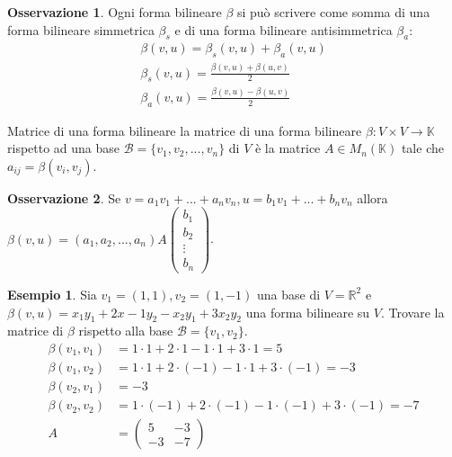 \documentclass[a4paper]{article}
\theoremstyle{definition}
\newtheorem*{oss}{Osservazione}
\newtheorem*{es}{Esempio}
\begin{document}
	\begin{oss}
		Ogni forma bilineare $\beta$ si può scrivere come somma di una forma bilineare simmetrica $\beta_s$ e di una forma bilineare antisimmetrica $\beta_a$:
		\begin{align*}
			\beta(v, u) = \beta_s(v, u) + \beta_a(v, u) \\
			\beta_s(v, u) = \frac{\beta(v, u) + \beta(u, v)}{2} \\
			\beta_a(v, u) = \frac{\beta(v, u) - \beta(u, v)}{2}
		\end{align*}
	\end{oss}

	\begin{deff}{Matrice di una forma bilineare}{}
		la matrice di una forma bilineare $\beta: V \times V \to \mathbb{K}$ rispetto ad una base $\mathcal{B} = \{v_1, v_2, ..., v_n\}$ di $V$ è la matrice $A \in M_n(\mathbb{K})$ tale che $a_{ij} = \beta(v_i, v_j)$.
	\end{deff}
	\begin{oss}
		Se $v = a_1v_1 + ... + a_nv_n, u = b_1v_1 + ... + b_nv_n$ allora $\beta(v, u) = (a_1, a_2, ..., a_n)A \begin{pmatrix}
			b_1 \\
			b_2 \\
			\vdots \\
			b_n
		\end{pmatrix}$.
	\end{oss}

	\begin{es}
		Sia $v_1 = (1, 1), v_2 = (1, -1)$ una base di $V = \mathbb{R}^2$ e $\beta(v, u) = x_1y_1 + 2x-1y_2 - x_2y_1 + 3x_2y_2$ una forma bilineare su $V$.
		Trovare la matrice di $\beta$ rispetto alla base $\mathcal{B} = \{v_1, v_2\}$.
		\begin{align*}
			\beta(v_1, v_1) &= 1 \cdot 1 + 2 \cdot 1 - 1 \cdot 1 + 3 \cdot 1 = 5 \\
			\beta(v_1, v_2) &= 1 \cdot 1 + 2 \cdot (-1) - 1 \cdot 1 + 3 \cdot (-1) = -3 \\
			\beta(v_2, v_1) &= -3 \\
			\beta(v_2, v_2) &= 1 \cdot (-1) + 2 \cdot (-1) - 1 \cdot (-1) + 3 \cdot (-1) = -7 \\
			A &= \begin{pmatrix}
				5 & -3 \\
				-3 & -7
			\end{pmatrix}
		\end{align*}
	\end{es}
\end{document}
